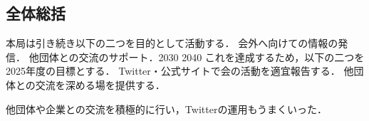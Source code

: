 \subsection*{全体総括}


本局は引き続き以下の二つを目的として活動する．
    会外へ向けての情報の発信．
    他団体との交流のサポート．2030
 2040
これを達成するため，以下の二つを2025年度の目標とする．
    Twitter・公式サイトで会の活動を適宜報告する．
    他団体との交流を深める場を提供する．

他団体や企業との交流を積極的に行い，Twitterの運用もうまくいった．
